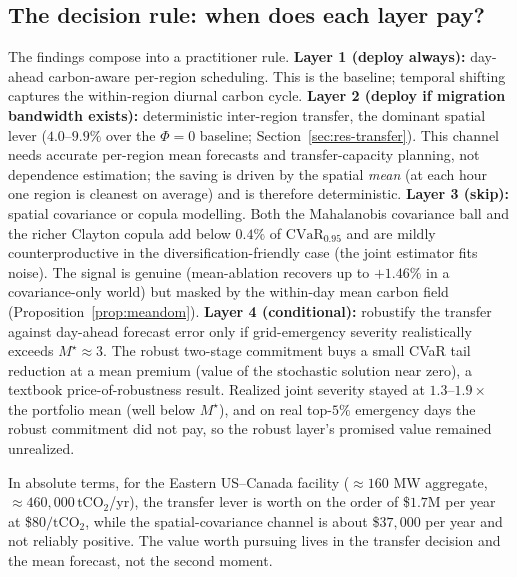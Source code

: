 \documentclass[10pt,twocolumn]{article}
\newcommand{\CVaR}{\mathrm{CVaR}}
\begin{document}
\subsection{The decision rule: when does each layer pay?}\label{sec:practical}
The findings compose into a practitioner rule. \textbf{Layer 1 (deploy always):}
day-ahead carbon-aware per-region scheduling. This is the baseline; temporal shifting
captures the within-region diurnal carbon cycle. \textbf{Layer 2 (deploy if migration
bandwidth exists):} deterministic inter-region transfer, the dominant spatial lever
($4.0$--$9.9\%$ over the $\Phi=0$ baseline;
Section~\ref{sec:res-transfer}). This channel needs accurate per-region mean forecasts
and transfer-capacity planning, not dependence estimation; the saving is driven by the
spatial \emph{mean} (at each hour one region is cleanest on average) and is therefore
deterministic. \textbf{Layer 3 (skip):} spatial covariance or copula modelling. Both
the Mahalanobis covariance ball and the richer Clayton copula add below $0.4\%$ of
$\CVaR_{0.95}$ and are mildly counterproductive in the diversification-friendly case
(the joint estimator fits noise). The signal is genuine (mean-ablation recovers up to
$+1.46\%$ in a covariance-only world) but masked by the within-day mean carbon field
(Proposition~\ref{prop:meandom}). \textbf{Layer 4 (conditional):} robustify the
transfer against day-ahead forecast error only if grid-emergency severity realistically
exceeds $M^\star\approx3$. The robust two-stage commitment buys a small CVaR tail
reduction at a mean premium (value of the stochastic solution near zero), a textbook
price-of-robustness result. Realized joint severity stayed at $1.3$--$1.9\times$ the
portfolio mean (well below $M^\star$), and on real top-$5\%$ emergency days the robust
commitment did not pay, so the robust layer's promised value remained unrealized.

In absolute terms, for the Eastern US--Canada facility ($\approx160$ MW aggregate,
$\approx460{,}000\,\text{tCO}_2$/yr), the transfer lever is worth on the order of
\$$1.7$M per year at \$$80/\text{tCO}_2$, while the spatial-covariance channel is
about \$$37{,}000$ per year and not reliably positive. The value worth pursuing lives
in the transfer decision and the mean forecast, not the second moment.
\end{document}
